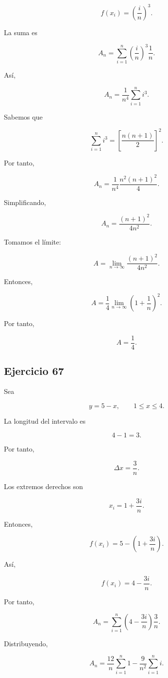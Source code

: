 \documentclass[12pt]{article}
\begin{document}
\[
f(x_i)
=
\left(\frac{i}{n}\right)^3.
\]

La suma es

\[
A_n
=
\sum_{i=1}^{n}
\left(\frac{i}{n}\right)^3
\frac1n.
\]

Así,

\[
A_n
=
\frac{1}{n^4}
\sum_{i=1}^{n}i^3.
\]

Sabemos que

\[
\sum_{i=1}^{n}i^3
=
\left[
\frac{n(n+1)}{2}
\right]^2.
\]

Por tanto,

\[
A_n
=
\frac{1}{n^4}
\frac{n^2(n+1)^2}{4}.
\]

Simplificando,

\[
A_n
=
\frac{(n+1)^2}{4n^2}.
\]

Tomamos el límite:

\[
A
=
\lim_{n\to\infty}
\frac{(n+1)^2}{4n^2}.
\]

Entonces,

\[
A
=
\frac14
\lim_{n\to\infty}
\left(
1+\frac1n
\right)^2.
\]

Por tanto,

\[
\boxed{
A=\frac14
}.
\]

\subsection*{Ejercicio 67}

Sea

\[
y=5-x,
\qquad
1\leq x\leq4.
\]

La longitud del intervalo es

\[
4-1=3.
\]

Por tanto,

\[
\Delta x
=
\frac3n.
\]

Los extremos derechos son

\[
x_i
=
1+\frac{3i}{n}.
\]

Entonces,

\[
f(x_i)
=
5-
\left(
1+\frac{3i}{n}
\right).
\]

Así,

\[
f(x_i)
=
4-\frac{3i}{n}.
\]

Por tanto,

\[
A_n
=
\sum_{i=1}^{n}
\left(
4-\frac{3i}{n}
\right)
\frac3n.
\]

Distribuyendo,

\[
A_n
=
\frac{12}{n}\sum_{i=1}^{n}1
-
\frac{9}{n^2}
\sum_{i=1}^{n}i.
\]
\end{document}
